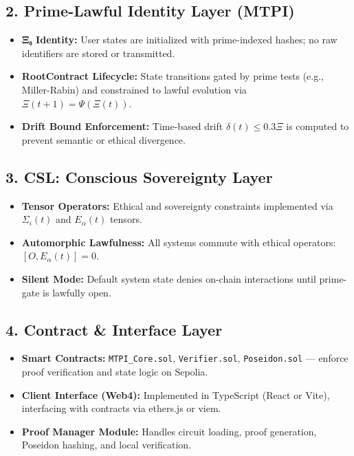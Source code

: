 \documentclass[12]{amsart}
\theoremstyle{plain}
\begin{document}
\subsection{2. Prime-Lawful Identity Layer (MTPI)}
\begin{itemize}
  \item \textbf{Ξ₀ Identity:} User states are initialized with prime-indexed hashes; no raw identifiers are stored or transmitted.
  \item \textbf{RootContract Lifecycle:} State transitions gated by prime tests (e.g., Miller-Rabin) and constrained to lawful evolution via $\Xi(t+1) = \Psi(\Xi(t))$.
  \item \textbf{Drift Bound Enforcement:} Time-based drift $\delta(t) \leq 0.3 \Xi$ is computed to prevent semantic or ethical divergence.
\end{itemize}

\subsection{3. CSL: Conscious Sovereignty Layer}
\begin{itemize}
  \item \textbf{Tensor Operators:} Ethical and sovereignty constraints implemented via $\Sigma_i(t)$ and $E_\alpha(t)$ tensors.
  \item \textbf{Automorphic Lawfulness:} All systems commute with ethical operators: $[O, E_\alpha(t)] = 0$.
  \item \textbf{Silent Mode:} Default system state denies on-chain interactions until prime-gate is lawfully open.
\end{itemize}

\subsection{4. Contract & Interface Layer}
\begin{itemize}
  \item \textbf{Smart Contracts:} \texttt{MTPI\_Core.sol}, \texttt{Verifier.sol}, \texttt{Poseidon.sol} — enforce proof verification and state logic on Sepolia.
  \item \textbf{Client Interface (Web4):} Implemented in TypeScript (React or Vite), interfacing with contracts via ethers.js or viem.
  \item \textbf{Proof Manager Module:} Handles circuit loading, proof generation, Poseidon hashing, and local verification.
\end{itemize}
\end{document}
